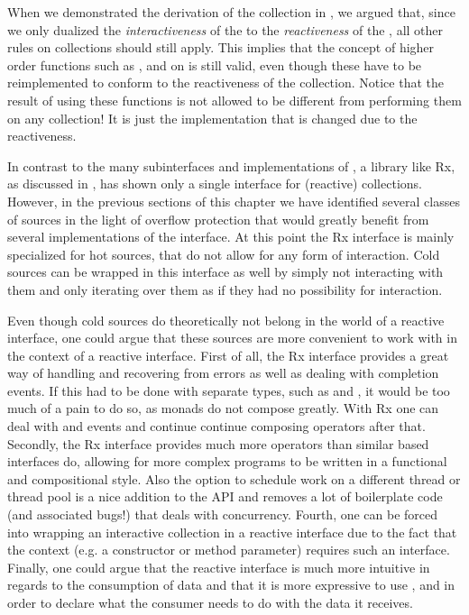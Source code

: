 When we demonstrated the derivation of the \obs collection in , we argued that, since we only dualized the \textit{interactiveness} of the \ieb to the \textit{reactiveness} of the \obs, all other rules on collections should still apply. This implies that the concept of higher order functions such as ,  and  on \ieb is still valid, even though these have to be reimplemented to conform to the reactiveness of the \obs collection. Notice that the result of using these functions is not allowed to be different from performing them on any \ieb collection! It is just the implementation that is changed due to the reactiveness.

In contrast to the many subinterfaces and implementations of \itb, a library like Rx, as discussed in , has shown only a single interface for (reactive) collections. However, in the previous sections of this chapter we have identified several classes of sources in the light of overflow protection that would greatly benefit from several implementations of the \obs interface. At this point the Rx interface is mainly specialized for hot sources, that do not allow for any form of interaction. Cold sources can be wrapped in this interface as well by simply not interacting with them and only iterating over them as if they had no possibility for interaction.

Even though cold sources do theoretically not belong in the world of a reactive interface, one could argue that these sources are more convenient to work with in the context of a reactive interface. First of all, the Rx interface provides a great way of handling and recovering from errors as well as dealing with completion events. If this had to be done with separate types, such as  and , it would be too much of a pain to do so, as monads do not compose greatly. With Rx one can deal with  and  events and continue continue composing operators after that. Secondly, the Rx interface provides much more operators than similar \itb based interfaces do, allowing for more complex programs to be written in a functional and compositional style. Also the option to schedule work on a different thread or thread pool is a nice addition to the API and removes a lot of boilerplate code (and associated bugs!) that deals with concurrency. Fourth, one can be forced into wrapping an interactive collection in a reactive interface due to the fact that the context (e.g. a constructor or method parameter) requires such an interface. Finally, one could argue that the reactive interface is much more intuitive in regards to the consumption of data and that it is more expressive to use ,  and  in order to declare what the consumer needs to do with the data it receives.

